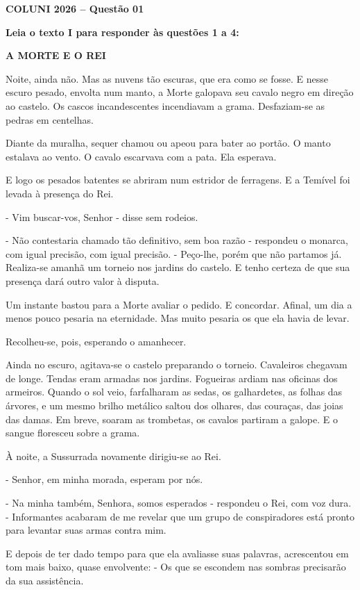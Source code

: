 \textbf{COLUNI 2026 -- Questão 01}\par\medskip \textbf{Leia o texto I para responder às questões 1 a 4:}

\begin{center}\textbf{A MORTE E O REI}\end{center}

Noite, ainda não. Mas as nuvens tão escuras, que era como se fosse. E nesse escuro pesado, envolta num manto, a Morte galopava seu cavalo negro em direção ao castelo. Os cascos incandescentes incendiavam a grama. Desfaziam-se as pedras em centelhas.

Diante da muralha, sequer chamou ou apeou para bater ao portão. O manto estalava ao vento. O cavalo escarvava com a pata. Ela esperava.

E logo os pesados batentes se abriram num estridor de ferragens. E a Temível foi levada à presença do Rei.

- Vim buscar-vos, Senhor - disse sem rodeios.

- Não contestaria chamado tão definitivo, sem boa razão - respondeu o monarca, com igual precisão, com igual precisão. - Peço-lhe, porém que não partamos já. Realiza-se amanhã um torneio nos jardins do castelo. E tenho certeza de que sua presença dará outro valor à disputa.

Um instante bastou para a Morte avaliar o pedido. E concordar. Afinal, um dia a menos pouco pesaria na eternidade. Mas muito pesaria os que ela havia de levar.

Recolheu-se, pois, esperando o amanhecer.

Ainda no escuro, agitava-se o castelo preparando o torneio. Cavaleiros chegavam de longe. Tendas eram armadas nos jardins. Fogueiras ardiam nas oficinas dos armeiros. Quando o sol veio, farfalharam as sedas, os galhardetes, as folhas das árvores, e um mesmo brilho metálico saltou dos olhares, das couraças, das joias das damas. Em breve, soaram as trombetas, os cavalos partiram a galope. E o sangue floresceu sobre a grama.

À noite, a Sussurrada novamente dirigiu-se ao Rei.

- Senhor, em minha morada, esperam por nós.

- Na minha também, Senhora, somos esperados - respondeu o Rei, com voz dura. - Informantes acabaram de me revelar que um grupo de conspiradores está pronto para levantar suas armas contra mim.

E depois de ter dado tempo para que ela avaliasse suas palavras, acrescentou em tom mais baixo, quase envolvente: - Os que se escondem nas sombras precisarão da sua assistência.

